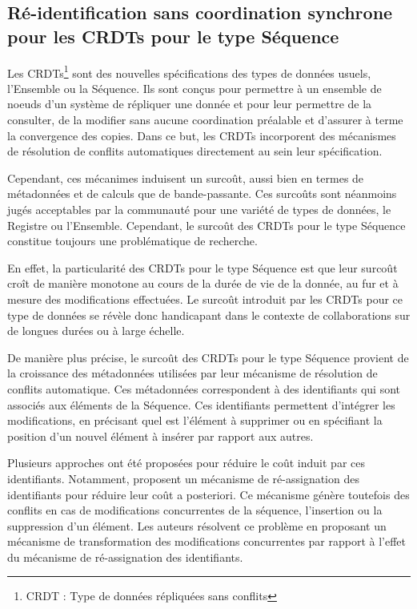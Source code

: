 \subsection{Ré-identification sans coordination synchrone pour les \acp{CRDT} pour le type Séquence}
\label{sec:research-questions-rls}

Les \acfp{CRDT}\footnote{\acf{CRDT} : Type de données répliquées sans conflits} \cite{2007-crdt-shapiro,shapiro_2011_crdt} sont des nouvelles spécifications des types de données usuels, \eg l'Ensemble ou la Séquence.
Ils sont conçus pour permettre à un ensemble de noeuds d'un système de répliquer une donnée et pour leur permettre de la consulter, de la modifier sans aucune coordination préalable et d'assurer à terme la convergence des copies.
Dans ce but, les \acp{CRDT} incorporent des mécanismes de résolution de conflits automatiques directement au sein leur spécification.

Cependant, ces mécanimes induisent un surcoût, aussi bien en termes de métadonnées et de calculs que de bande-passante.
Ces surcoûts sont néanmoins jugés acceptables par la communauté pour une variété de types de données, \eg le Registre ou l'Ensemble.
Cependant, le surcoût des \acp{CRDT} pour le type Séquence constitue toujours une problématique de recherche.

En effet, la particularité des \acp{CRDT} pour le type Séquence est que leur surcoût croît de manière monotone au cours de la durée de vie de la donnée, \ie au fur et à mesure des modifications effectuées.
Le surcoût introduit par les \acp{CRDT} pour ce type de données se révèle donc handicapant dans le contexte de collaborations sur de longues durées ou à large échelle.

De manière plus précise, le surcoût des \acp{CRDT} pour le type Séquence provient de la croissance des métadonnées utilisées par leur mécanisme de résolution de conflits automatique.
Ces métadonnées correspondent à des identifiants qui sont associés aux éléments de la Séquence.
Ces identifiants permettent d'intégrer les modifications, \eg en précisant quel est l'élément à supprimer ou en spécifiant la position d'un nouvel élément à insérer par rapport aux autres.

Plusieurs approches ont été proposées pour réduire le coût induit par ces identifiants.
Notamment, \cite{letia:hal-01248270,zawirski:hal-01248197} proposent un mécanisme de ré-assignation des identifiants pour réduire leur coût a posteriori.
Ce mécanisme génère toutefois des conflits en cas de modifications concurrentes de la séquence, \ie l'insertion ou la suppression d'un élément.
Les auteurs résolvent ce problème en proposant un mécanisme de transformation des modifications concurrentes par rapport à l'effet du mécanisme de ré-assignation des identifiants.

